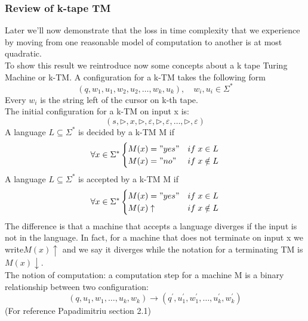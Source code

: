 \subsubsection*{Review of k-tape TM}
Later we'll now demonstrate that the loss in time complexity that we experience by moving from one reasonable model of computation to another is at most quadratic.\\
To show this result we reintroduce now some concepts about a k tape Turing Machine or k-TM. A configuration for a k-TM takes the following form
\[ 
    (q,w_1,u_1,w_2,u_2,\ldots,w_k,u_k),\quad w_i,u_i \in \Sigma^*
\]
Every $w_i$ is the string left of the cursor on k-th tape.\\ The initial configuration for a k-TM on input x is:
\[ 
     (s,\triangleright,x,\triangleright,\varepsilon,\triangleright,\varepsilon, \ldots,\triangleright,\varepsilon)
\]
A language $L\subseteq \Sigma^*$ is decided by a k-TM M if
\[ 
    \forall x \in \Sigma^* 
     \begin{cases}
        M(x) = "yes" & if \; x\in L \\
        M(x) = "no" & if \; x \notin L 
     \end{cases}
\]
A language $L\subseteq \Sigma^*$ is accepted by a k-TM M if
\[ 
    \forall x \in \Sigma^* 
     \begin{cases}
        M(x) = "yes" & if \; x\in L \\
        M(x)\uparrow & if \; x \notin L 
     \end{cases}
\]The difference is that a machine that accepts a language diverges if the input is not in the language. In fact, for a machine that does not terminate on input x we write$ M(x) \uparrow $ and we say it diverges while the notation for a terminating TM is $ M(x) \downarrow $.\\
The notion of computation: a computation step for a machine M is a binary relationship between two configuration: \[ 
    (q, u_{1},w_{1}, \ldots,u_{k},w_{k}) \longrightarrow (q^{'},u_{1}^{'},w_{1}^{'}, \ldots,u_{k}^{'},w_{k}^{'})
\]
(For reference Papadimitriu section 2.1)


